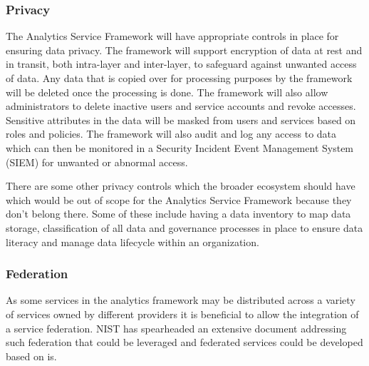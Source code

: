 \subsubsection{Privacy}\label{sec:privacy}

The Analytics Service Framework will have appropriate controls in
place for ensuring data privacy. The framework will support encryption
of data at rest and in transit, both intra-layer and inter-layer, to
safeguard against unwanted access of data. Any data that is copied
over for processing purposes by the framework will be deleted once the
processing is done. The framework will also allow administrators to
delete inactive users and service accounts and revoke
accesses. Sensitive attributes in the data will be masked from users
and services based on roles and policies. The framework will also
audit and log any access to data which can then be monitored in a
Security Incident Event Management System (SIEM) for unwanted or
abnormal access.

There are some other privacy controls which the broader ecosystem
should have which would be out of scope for the Analytics Service
Framework because they don't belong there. Some of these include
having a data inventory to map data storage, classification of all
data and governance processes in place to ensure data literacy and
manage data lifecycle within an organization.

\subsubsection{Federation}

As some services in the analytics framework may be distributed across
a variety of services owned by different providers it is beneficial to
allow the integration of a service federation. NIST has spearheaded an
extensive document \cite{nist-Lee2020} addressing such federation that
could be leveraged and federated services could be developed based on
is.

\begin{comment}
\subsubsection{Artifacts}

function
data
logs and  audit

\subsubsection{Privacy}

privacy
    input
    output
    function
    
asynchronous events, how does privacy apply
batch functions
streaming functions

data
\end{comment}
